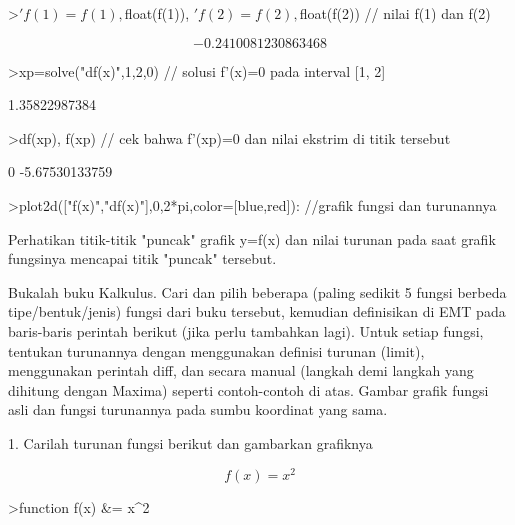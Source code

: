 \documentclass{article}
\begin{document}
\begin{eulernotebook}
\begin{eulercomment}
\begin{eulercomment}
\begin{eulercomment}
\begin{eulercomment}
\begin{eulercomment}
\begin{eulercomment}
\begin{euleroutput}
\end{euleroutput}
\begin{eulerprompt}
>$'f(1)=f(1), $float(f(1)), $'f(2)=f(2), $float(f(2)) // nilai f(1) dan f(2)
\end{eulerprompt}
\begin{eulerformula}
\[
-0.2410081230863468
\]
\end{eulerformula}
\begin{eulerprompt}
>xp=solve("df(x)",1,2,0) // solusi f'(x)=0 pada interval [1, 2]
\end{eulerprompt}
\begin{euleroutput}
  1.35822987384
\end{euleroutput}
\begin{eulerprompt}
>df(xp), f(xp) // cek bahwa f'(xp)=0 dan nilai ekstrim di titik tersebut
\end{eulerprompt}
\begin{euleroutput}
  0
  -5.67530133759
\end{euleroutput}
\begin{eulerprompt}
>plot2d(["f(x)","df(x)"],0,2*pi,color=[blue,red]): //grafik fungsi dan turunannya
\end{eulerprompt}
\begin{eulercomment}
Perhatikan titik-titik "puncak" grafik y=f(x) dan nilai turunan pada
saat grafik fungsinya mencapai titik "puncak" tersebut.
\end{eulercomment}
\begin{eulercomment}
Bukalah buku Kalkulus. Cari dan pilih beberapa (paling sedikit 5
fungsi berbeda tipe/bentuk/jenis) fungsi dari buku tersebut, kemudian
definisikan di EMT pada baris-baris perintah berikut (jika perlu
tambahkan lagi). Untuk setiap fungsi, tentukan turunannya dengan
menggunakan definisi turunan (limit), menggunakan perintah diff, dan
secara manual (langkah demi langkah yang dihitung dengan Maxima)
seperti contoh-contoh di atas. Gambar grafik fungsi asli dan fungsi
turunannya pada sumbu koordinat yang sama.

1. Carilah turunan fungsi berikut dan gambarkan grafiknya\\
\end{eulercomment}
\begin{eulerformula}
\[
f(x)=x^2
\]
\end{eulerformula}
\begin{eulerprompt}
>function f(x) &= x^2
\end{eulerprompt}
\begin{euleroutput}
  

\end{euleroutput}
\end{eulercomment}
\end{eulercomment}
\end{eulercomment}
\end{eulercomment}
\end{eulercomment}
\end{eulercomment}
\end{eulernotebook}
\end{document}
